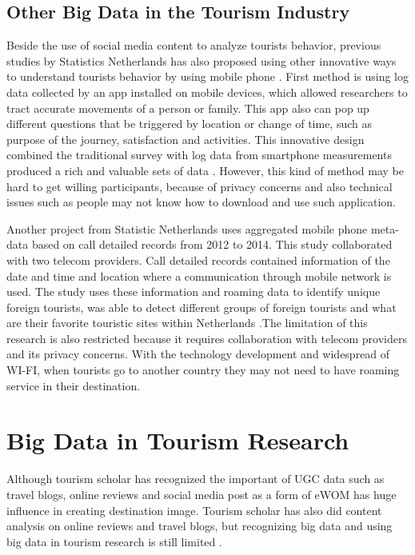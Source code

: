 \documentclass[sigconf]{acmart}
\begin{document}
\subsection{Other Big Data in the Tourism Industry}
Beside the use of social media content to analyze tourists behavior, previous studies by Statistics Netherlands has also proposed using other innovative ways to understand tourists behavior by using mobile phone \cite{heerschap2014innovation}. First method is using log data collected by an app installed on mobile devices, which allowed researchers to tract accurate movements of a person or family. This app also can pop up different questions that be triggered by location or change of time, such as purpose of the journey, satisfaction and activities. This innovative design combined the traditional survey with log data from smartphone measurements produced a rich and valuable sets of data \cite{heerschap2014innovation}. However, this kind of method may be hard to get willing participants, because of privacy concerns and also technical issues such as people may not know how to download and use such application.

Another project from Statistic Netherlands uses aggregated mobile phone meta-data based on call detailed records from 2012 to 2014. This study collaborated with two telecom providers. Call detailed records contained information of the date and time and location where a communication through mobile network is used. The study uses these information and roaming data to identify unique foreign tourists, was able to detect different groups of foreign tourists and what are their favorite touristic sites within Netherlands \cite{heerschap2014innovation}.The limitation of this research is also restricted because it requires collaboration with telecom providers and its privacy concerns. With the technology development and widespread of WI-FI, when tourists go to another country they may not need to have roaming service in their destination.   


\section{Big Data in Tourism Research}
Although tourism scholar has recognized the important of UGC data such as travel blogs, online reviews and social media post as a form of eWOM has huge influence in creating destination image. Tourism scholar has also did content analysis on online reviews and travel blogs, but recognizing big data and using big data in tourism research is still limited \cite{Williams201787,chung2009}. 
\end{document}

